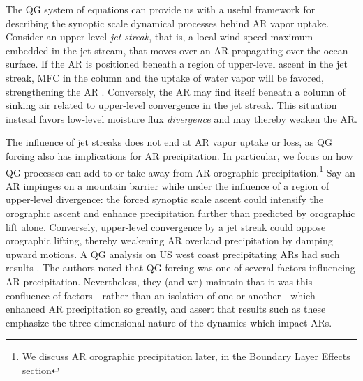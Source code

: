 \documentclass[letterpaper,12pt]{article}
\begin{document}
The QG system of equations can provide us with a useful framework for describing the synoptic scale dynamical processes behind AR vapor uptake. Consider an upper-level \textit{jet streak}, that is, a local wind speed maximum embedded in the jet stream, 
that moves over an AR propagating over the ocean surface. If the AR is positioned beneath a region of upper-level ascent in the jet streak, MFC in the column and the uptake of water vapor will be favored, strengthening the AR \cite{Cordeira2013The2010}. Conversely, the AR may find itself beneath a column of sinking air related to upper-level convergence in the jet streak. This situation instead favors low-level moisture flux \textit{divergence} and may thereby weaken the AR.

The influence of jet streaks does not end at AR vapor uptake or loss, as QG forcing also has implications for AR precipitation. In particular, we focus on how QG processes can add to or take away from AR orographic precipitation.\footnote{We discuss AR orographic precipitation later, in the Boundary Layer Effects section} %
Say an AR impinges on a mountain barrier while under the influence of a region of upper-level divergence: the forced synoptic scale ascent could intensify the orographic ascent and enhance precipitation further than predicted by orographic lift alone. Conversely, upper-level convergence by a jet streak could oppose orographic lifting, thereby weakening AR overland precipitation by damping upward motions. A QG analysis on US west coast precipitating ARs had such results \cite{HechtCharacterizingCalifornia}.
The authors noted that QG forcing was one of several factors influencing AR precipitation. Nevertheless, they (and we) maintain that it was this confluence of factors---rather than an isolation of one or another---which enhanced AR precipitation so greatly, and assert that results such as these emphasize the three-dimensional nature of the dynamics which impact ARs. 
\end{document}
